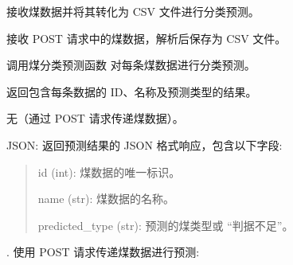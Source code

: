 \documentclass[a4paper,12pt,english]{sphinxmanual}
\begin{document}
\begin{fulllineitems}
\label{\detokenize{api/login:login.getClassifyData}}
\pysigstartsignatures
{}
\pysigstopsignatures
\sphinxAtStartPar
接收煤数据并将其转化为 CSV 文件进行分类预测。
\begin{description}
\sphinxAtStartPar
接收 POST 请求中的煤数据，解析后保存为 CSV 文件。

\sphinxAtStartPar
调用煤分类预测函数  对每条煤数据进行分类预测。

\sphinxAtStartPar
返回包含每条数据的 ID、名称及预测类型的结果。

\sphinxAtStartPar
无（通过 POST 请求传递煤数据）。

\sphinxAtStartPar
JSON: 返回预测结果的 JSON 格式响应，包含以下字段:
\begin{quote}

\sphinxAtStartPar
id (int): 煤数据的唯一标识。

\sphinxAtStartPar
name (str): 煤数据的名称。

\sphinxAtStartPar
predicted\_type (str): 预测的煤类型或 “判据不足”。
\end{quote}

. 使用 POST 请求传递煤数据进行预测:

\begin{sphinxVerbatim}[commandchars=\\\{\}]
 
\PYG{p}{[}
         
         
         
         
         
         
         
\PYG{p}{]}


\end{sphinxVerbatim}
\end{description}
\end{fulllineitems}
\end{document}
